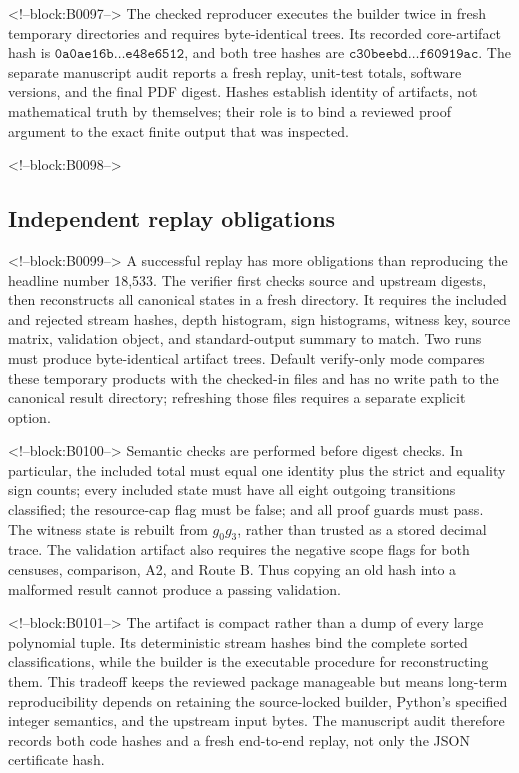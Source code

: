 \documentclass[11pt,a4paper]{article}
\theoremstyle{definition}
\begin{document}
<!--block:B0097-->
The checked reproducer executes the builder twice in fresh temporary
directories and requires byte-identical trees.  Its recorded core-artifact
hash is
\(\texttt{0a0ae16b}\ldots\texttt{e48e6512}\), and both tree hashes are
\(\texttt{c30beebd}\ldots\texttt{f60919ac}\).  The separate manuscript audit
reports a fresh replay, unit-test totals, software versions, and the final PDF
digest.  Hashes establish identity of artifacts, not mathematical truth by
themselves; their role is to bind a reviewed proof argument to the exact
finite output that was inspected.

<!--block:B0098-->
\subsection{Independent replay obligations}

<!--block:B0099-->
A successful replay has more obligations than reproducing the headline
number 18,533.  The verifier first checks source and upstream digests, then
reconstructs all canonical states in a fresh directory.  It requires the
included and rejected stream hashes, depth histogram, sign histograms,
witness key, source matrix, validation object, and standard-output summary to
match.  Two runs must produce byte-identical artifact trees.  Default
verify-only mode compares these temporary products with the checked-in files
and has no write path to the canonical result directory; refreshing those
files requires a separate explicit option.

<!--block:B0100-->
Semantic checks are performed before digest checks.  In particular, the
included total must equal one identity plus the strict and equality sign
counts; every included state must have all eight outgoing transitions
classified; the resource-cap flag must be false; and all proof guards must
pass.  The witness state is rebuilt from \(g_0g_3\), rather than trusted as a
stored decimal trace.  The validation artifact also requires the negative
scope flags for both censuses, comparison, A2, and Route B.  Thus copying an
old hash into a malformed result cannot produce a passing validation.

<!--block:B0101-->
The artifact is compact rather than a dump of every large polynomial tuple.
Its deterministic stream hashes bind the complete sorted classifications,
while the builder is the executable procedure for reconstructing them.  This
tradeoff keeps the reviewed package manageable but means long-term
reproducibility depends on retaining the source-locked builder, Python's
specified integer semantics, and the upstream input bytes.  The manuscript
audit therefore records both code hashes and a fresh end-to-end replay, not
only the JSON certificate hash.
\end{document}
